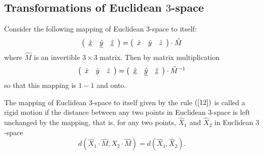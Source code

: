 
\subsection*{Transformations of Euclidean $3$-space}

Consider the following mapping of Euclidean $3$-space to itself:%
\begin{equation}
\left(
\begin{array}
[c]{ccc}%
\underline{\hat{x}} & \underline{\hat{y}} & \underline{\hat{z}}%
\end{array}
\right)  =\left(
\begin{array}
[c]{ccc}%
\hat{x} & \hat{y} & \hat{z}%
\end{array}
\right)  \cdot\hat{M} \label{12}%
\end{equation}
where $\hat{M}$ is an invertible $3\times3$ matrix. Then by matrix
multiplication%
\[
\left(
\begin{array}
[c]{ccc}%
\hat{x} & \hat{y} & \hat{z}%
\end{array}
\right)  =\left(
\begin{array}
[c]{ccc}%
\underline{\hat{x}} & \underline{\hat{y}} & \underline{\hat{z}}%
\end{array}
\right)  \cdot\hat{M}^{-1}%
\]
so that this mapping is $1-1$ and onto.

\begin{definition}
The mapping of Euclidean $3$-space to itself given by the rule $\left(
\ref{12}\right)  $ is called a rigid motion if the distance between any two
points in Euclidean $3$-space is left unchanged by the mapping, that is, for
any two points, $\hat{X}_{1}$ and $\hat{X}_{2}$ in Euclidean $3$-space%
\[
d\left( \hat{X}_{1}  \cdot\hat{M},\hat{X}_{2}
\cdot\hat{M}\right)  =d\left(  \hat{X}_{1},\hat{X}_{2}\right)  .
\]

\end{definition}

